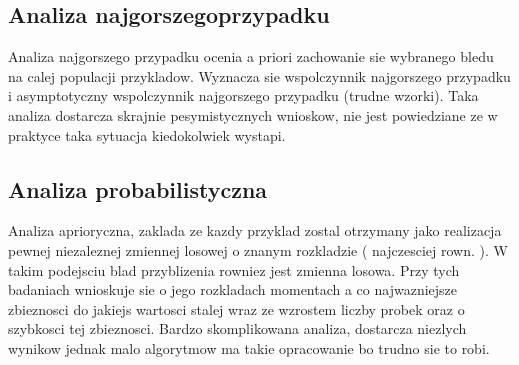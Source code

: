 \subsection{Analiza najgorszegoprzypadku}
Analiza najgorszego przypadku ocenia a priori zachowanie sie wybranego bledu na calej populacji przykladow. Wyznacza sie wspolczynnik najgorszego przypadku i asymptotyczny wspolczynnik najgorszego przypadku (trudne wzorki).  Taka analiza dostarcza skrajnie pesymistycznych wnioskow, nie jest powiedziane ze w praktyce taka sytuacja kiedokolwiek wystapi.

\subsection{Analiza probabilistyczna}
Analiza aprioryczna, zaklada ze kazdy przyklad zostal otrzymany jako realizacja pewnej niezaleznej zmiennej losowej o znanym rozkladzie ( najczesciej rown. ). W takim podejsciu blad przyblizenia rowniez jest zmienna losowa. Przy tych badaniach wnioskuje sie o jego rozkladach momentach a co najwazniejsze zbieznosci do jakiejs wartosci stalej wraz ze wzrostem liczby probek oraz o szybkosci tej zbieznosci. Bardzo skomplikowana analiza, dostarcza niezlych wynikow jednak malo algorytmow ma takie opracowanie bo trudno sie to robi.
